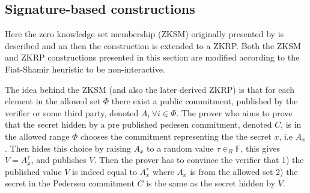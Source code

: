 \subsection{Signature-based  constructions}
Here the zero knowledge set membership (ZKSM) originally presented by \cite{RANGE-SET} is described and an then the construction is  extended to a ZKRP. Both the ZKSM and ZKRP constructions presented in this section are modified according to the Fiat-Shamir heuristic to be non-interactive.

The idea behind the ZKSM (and also the later derived ZKRP) is that for each element in the allowed set $\Phi$ there exist a public commitment, published by the verifier or some third party, denoted $A_i\: \forall i\in\Phi$. The prover who aims to prove that the secret hidden by a pre published pedesen commitment, denoted $C$, is in the allowed range $\Phi$ chooses the commitment representing the the secret $x$, i.e $A_x$. Then hides this choice by raising $A_x$  to a random value $\tau\in_R\mathds{F}$, this gives $V = A_x^\tau$, and publishes $V$. Then the prover has to convince the verifier that  1) the published value $V$ is indeed equal to  $A_x^\tau$ where $A_x$ is from the allowed set  2) the secret in the Pedersen commitment $C$  is the same as the secret hidden by $V$.



